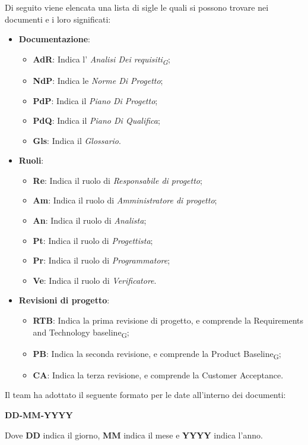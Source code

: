 Di seguito viene elencata una lista di sigle le quali si possono trovare nei documenti e i loro significati:
\begin{itemize}
\item \textbf{Documentazione}:
	\begin{itemize}
	\item \textbf{AdR}: Indica l' \textit{Analisi Dei requisiti\textsubscript{G}};
	\item \textbf{NdP}: Indica le \textit{Norme Di Progetto};
	\item \textbf{PdP}: Indica il \textit{Piano Di Progetto};
	\item \textbf{PdQ}: Indica il \textit{Piano Di Qualifica};
	\item \textbf{Gls}: Indica il \textit{Glossario}.
	\end{itemize}
\item \textbf{Ruoli}:
	\begin{itemize}
	\item \textbf{Re}: Indica il ruolo di \textit{Responsabile di progetto};
	\item \textbf{Am}: Indica il ruolo di \textit{Amministratore di progetto};
	\item \textbf{An}: Indica il ruolo di \textit{Analista};
	\item \textbf{Pt}: Indica il ruolo di \textit{Progettista};
	\item \textbf{Pr}: Indica il ruolo di \textit{Programmatore};
	\item \textbf{Ve}: Indica il ruolo di \textit{Verificatore}.
	\end{itemize}
\item \textbf{Revisioni di progetto}:
	\begin{itemize}
		\item \textbf{RTB}: Indica la prima revisione di progetto, e comprende la Requirements and Technology baseline\textsubscript{G};
		\item \textbf{PB}: Indica la seconda revisione, e comprende la Product Baseline\textsubscript{G};
		\item \textbf{CA}: Indica la terza revisione, e comprende la Customer Acceptance.
	\end{itemize}
\end{itemize}
Il team ha adottato il seguente formato per le date all'interno dei documenti:
\begin{center}
    \large{\textbf{DD-MM-YYYY}}
\end{center}
Dove \textbf{DD} indica il giorno, \textbf{MM} indica il mese e \textbf{YYYY} indica l'anno.

